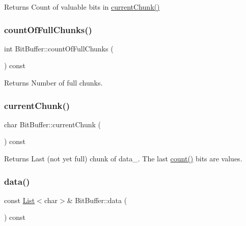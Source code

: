 \begin{DoxyReturn}{Returns}
Count of valuable bits in \hyperlink{class_bit_buffer_a3f5383b7d9b27478f614cd8762a266a5}{current\+Chunk()} 
\end{DoxyReturn}
\mbox{\label{class_bit_buffer_ad473b6b2aedbb96198d57d5762c5c108}} 
\subsubsection{\texorpdfstring{count\+Of\+Full\+Chunks()}{countOfFullChunks()}}
{\footnotesize\ttfamily int Bit\+Buffer\+::count\+Of\+Full\+Chunks (\begin{DoxyParamCaption}{ }\end{DoxyParamCaption}) const\hspace{0.3cm}{\ttfamily [inline]}}

\begin{DoxyReturn}{Returns}
Number of full chunks. 
\end{DoxyReturn}
\mbox{\label{class_bit_buffer_a3f5383b7d9b27478f614cd8762a266a5}} 
\subsubsection{\texorpdfstring{current\+Chunk()}{currentChunk()}}
{\footnotesize\ttfamily char Bit\+Buffer\+::current\+Chunk (\begin{DoxyParamCaption}{ }\end{DoxyParamCaption}) const\hspace{0.3cm}{\ttfamily [inline]}}

\begin{DoxyReturn}{Returns}
Last (not yet full) chunk of data\+\_\+. The last \hyperlink{class_bit_buffer_a8c13b651d37586ec5c2d30f45ed89e53}{count()} bits are values. 
\end{DoxyReturn}
\mbox{\label{class_bit_buffer_ad56372e6eb410a195913a0cae28d7006}} 
\subsubsection{\texorpdfstring{data()}{data()}}
{\footnotesize\ttfamily const \hyperlink{class_list}{List}$<$char$>$\& Bit\+Buffer\+::data (\begin{DoxyParamCaption}{ }\end{DoxyParamCaption}) const\hspace{0.3cm}{\ttfamily [inline]}}

